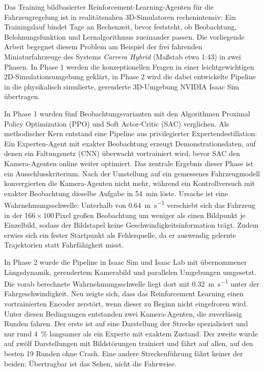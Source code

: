 {\renewcommand*{\chapterheadstartvskip}{\vspace*{-1.5cm}}}

Das Training bildbasierter Reinforcement-Learning-Agenten für die Fahrzeugregelung ist in realitätsnahen 3D-Simulatoren rechenintensiv: Ein Trainingslauf bindet Tage an Rechenzeit, bevor feststeht, ob Beobachtung, Belohnungsfunktion und Lernalgorithmus zueinander passen. Die vorliegende Arbeit begegnet diesem Problem am Beispiel der frei fahrenden Miniaturfahrzeuge des Systems \textit{Carrera Hybrid} (Maßstab etwa 1:43) in zwei Phasen. In Phase 1 werden die konzeptionellen Fragen in einer leichtgewichtigen 2D-Simulationsumgebung geklärt, in Phase 2 wird die dabei entwickelte Pipeline in die physikalisch simulierte, gerenderte 3D-Umgebung NVIDIA Isaac Sim übertragen.

In Phase 1 wurden fünf Beobachtungsvarianten mit den Algorithmen Proximal Policy Optimization (\ac{PPO}) und Soft Actor-Critic (\ac{SAC}) verglichen. Als methodischer Kern entstand eine Pipeline aus privilegierter Expertendestillation: Ein Experten-Agent mit exakter Beobachtung erzeugt Demonstrationsdaten, auf denen ein Faltungsnetz (\ac{CNN}) überwacht vortrainiert wird, bevor SAC den Kamera-Agenten online weiter optimiert. Das zentrale Ergebnis dieser Phase ist ein Ausschlusskriterium. Nach der Umstellung auf ein gemessenes Fahrzeugmodell konvergierten die Kamera-Agenten nicht mehr, während ein Kontrollversuch mit exakter Beobachtung dieselbe Aufgabe in \SI{54}{\minute} löste. Ursache ist eine Wahrnehmungsschwelle: Unterhalb von \SI{0.64}{\meter\per\second} verschiebt sich das Fahrzeug in der \num{166}\,$\times$\,\num{100}\,Pixel großen Beobachtung um weniger als einen Bildpunkt je Einzelbild, sodass der Bildstapel keine Geschwindigkeitsinformation trägt. Zudem erwies sich ein fester Startpunkt als Fehlerquelle, da er auswendig gelernte Trajektorien statt Fahrfähigkeit misst.

In Phase 2 wurde die Pipeline in Isaac Sim und Isaac Lab mit übernommener Längsdynamik, gerendertem Kamerabild und parallelen Umgebungen umgesetzt. Die vorab berechnete Wahrnehmungsschwelle liegt dort mit \SI{0.32}{\meter\per\second} unter der Fahrgeschwindigkeit. Neu zeigte sich, dass das Reinforcement Learning einen vortrainierten Encoder zerstört, wenn dieser zu Beginn nicht eingefroren wird. Unter diesen Bedingungen entstanden zwei Kamera-Agenten, die zuverlässig Runden fahren. Der erste ist auf eine Darstellung der Strecke spezialisiert und nur rund \SI{4}{\percent} langsamer als ein Experte mit exaktem Zustand. Der zweite wurde auf zwölf Darstellungen mit Bildstörungen trainiert und fährt auf allen, auf den besten 19 Runden ohne Crash. Eine andere Streckenführung fährt keiner der beiden: Übertragbar ist das Sehen, nicht die Fahrweise.

